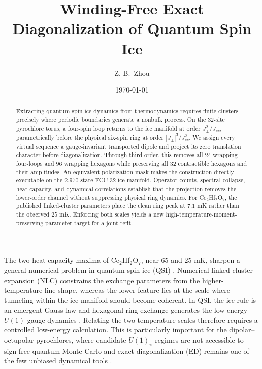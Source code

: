 \documentclass[reprint,amsmath,amssymb,aps,prl,superscriptaddress,floatfix]{revtex4-2}
\begin{document}
\title{Winding-Free Exact Diagonalization of Quantum Spin Ice}

\author{Z.-B.~Zhou}

\date{\today}

\begin{abstract}
Extracting quantum-spin-ice dynamics from thermodynamics requires finite
clusters precisely where periodic boundaries generate a nonbulk process.
On the 32-site pyrochlore torus, a four-spin loop returns to the ice manifold
at order $J_\pm^2/J_{zz}$, parametrically before the physical six-spin ring at
order $|J_\pm|^3/J_{zz}^2$.  We assign every virtual sequence a
gauge-invariant transported dipole and project its zero translation
character before diagonalization.  Through third order, this removes all 24
wrapping four-loops and 96 wrapping hexagons while preserving all 32
contractible hexagons and their amplitudes.  An equivalent polarization
mask makes the construction directly executable on the 2,970-state FCC-32
ice manifold.  Operator counts, spectral collapse, heat capacity, and
dynamical correlations establish that the projection removes the lower-order
channel without suppressing physical ring dynamics.  For Ce$_2$Hf$_2$O$_7$,
the published linked-cluster parameters place the clean ring peak at
$7.1$ mK rather than the observed $25$ mK.  Enforcing both scales yields a
new high-temperature-moment-preserving parameter target for a joint refit.
\end{abstract}

\maketitle

The two heat-capacity maxima of Ce$_2$Hf$_2$O$_7$, near $65$ and $25$ mK,
sharpen a general numerical problem in quantum spin ice (QSI)
\cite{Smith2025}.  Numerical linked-cluster expansion (NLC) constrains the
exchange parameters from the higher-temperature line shape, whereas the
lower feature lies at the scale where tunneling within the ice manifold
should become coherent.  In QSI, the ice rule is an emergent Gauss law and
hexagonal ring exchange generates the low-energy $U(1)$ gauge dynamics
\cite{Hermele2004,Gingras2014,Benton2012}.  Relating the two temperature
scales therefore requires a controlled low-energy calculation.  This is
particularly important for the
dipolar--octupolar pyrochlores, where candidate $U(1)_\pi$ regimes are not
accessible to sign-free quantum Monte Carlo and exact diagonalization (ED)
remains one of the few unbiased dynamical tools
\cite{Gaudet2019,Gao2019,Sibille2020,Smith2022,Poree2025}.
\end{document}
